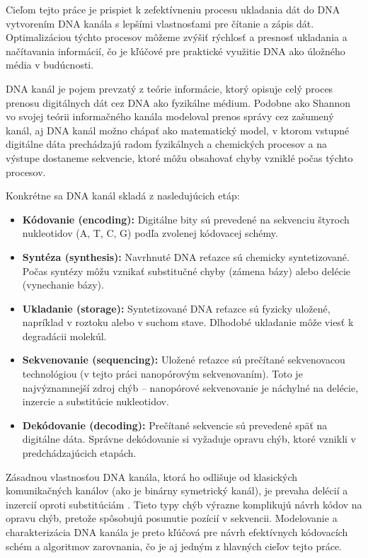 Cieľom tejto práce je prispiet k zefektívneniu procesu ukladania 
dát do DNA vytvorením DNA kanála s lepšími vlastnosťami pre čítanie a zápis dát.
Optimalizáciou týchto procesov môžeme zvýšiť rýchlosť a presnosť ukladania a načítavania informácií, 
čo je kľúčové pre praktické využitie DNA ako úložného média v budúcnosti.

DNA kanál je pojem prevzatý z teórie informácie, ktorý opisuje celý proces prenosu digitálnych dát cez DNA ako fyzikálne médium.
Podobne ako Shannon vo svojej teórii informačného kanála \cite{Shannon1948} modeloval prenos správy cez zašumený kanál,
aj DNA kanál možno chápať ako matematický model, v ktorom vstupné digitálne dáta prechádzajú radom fyzikálnych a chemických procesov a na výstupe
dostaneme sekvencie, ktoré môžu obsahovať chyby vzniklé počas týchto procesov.

Konkrétne sa DNA kanál skladá z nasledujúcich etáp:
\begin{itemize}
    \item \textbf{Kódovanie (encoding):} Digitálne bity sú prevedené na sekvenciu štyroch nukleotidov (A, T, C, G) podľa zvolenej kódovacej schémy.
    \item \textbf{Syntéza (synthesis):} Navrhnuté DNA reťazce sú chemicky syntetizované. Počas syntézy môžu vznikať substitučné chyby (zámena bázy) alebo delécie (vynechanie bázy).
    \item \textbf{Ukladanie (storage):} Syntetizované DNA reťazce sú fyzicky uložené, napríklad v roztoku alebo v suchom stave. Dlhodobé ukladanie môže viesť k degradácii molekúl.
    \item \textbf{Sekvenovanie (sequencing):} Uložené reťazce sú prečítané sekvenovacou technológiou (v tejto práci nanopórovým sekvenovaním). Toto je najvýznamnejší zdroj chýb -- nanopórové sekvenovanie je náchylné na delécie, inzercie a substitúcie nukleotidov.
    \item \textbf{Dekódovanie (decoding):} Prečítané sekvencie sú prevedené späť na digitálne dáta. Správne dekódovanie si vyžaduje opravu chýb, ktoré vznikli v predchádzajúcich etapách.
\end{itemize}

Zásadnou vlastnosťou DNA kanála, ktorá ho odlišuje od klasických komunikačných kanálov (ako je binárny symetrický kanál),
je prevaha delécií a inzercií oproti substitúciám \cite{Organick2018Random}.
Tieto typy chýb výrazne komplikujú návrh kódov na opravu chýb, pretože spôsobujú posunutie pozícií v sekvencii.
Modelovanie a charakterizácia DNA kanála je preto kľúčová pre návrh efektívnych kódovacích schém a algoritmov zarovnania,
čo je aj jedným z hlavných cieľov tejto práce.

